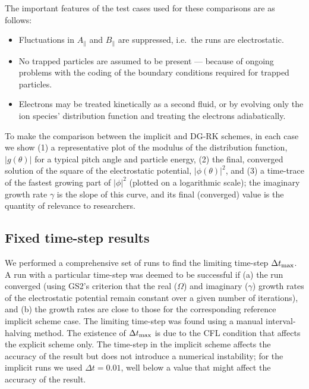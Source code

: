 \documentclass[10pt,a4paper]{article}
\begin{document}
The important features of the test cases used for these comparisons are as
follows:

\begin{itemize}

\item Fluctuations in $A_\parallel$ and $B_\parallel$ are suppressed, i.e.\
  the runs are electrostatic.

\item No trapped particles are assumed to be present --- because of ongoing
  problems with the coding of the boundary conditions required for trapped
  particles.

\item Electrons may be treated kinetically as a second fluid, or by evolving
  only the ion species' distribution function and treating the electrons
  adiabatically.

\end{itemize}

To make the comparison between the implicit and DG-RK schemes, in each case we
show (1) a representative plot of the modulus of the distribution function,
$|g(\theta)|$ for a typical pitch angle and particle energy, (2) the final,
converged solution of the square of the electrostatic potential,
$|\phi(\theta)|^2$, and (3) a time-trace of the fastest growing part of
$|\phi|^2$ (plotted on a logarithmic scale); the imaginary growth rate
$\gamma$ is the slope of this curve, and its final (converged) value is the
quantity of relevance to researchers.

\subsection{Fixed time-step results}

We performed a comprehensive set of runs to find the limiting time-step
$\Delta t_{\mbox{\scriptsize max}}$. A run with a particular time-step was
deemed to be successful if (a) the run converged (using GS2's criterion that
the real ($\Omega$) and imaginary ($\gamma$) growth rates of the electrostatic
potential remain constant over a given number of iterations), and (b) the
growth rates are close to those for the corresponding reference implicit
scheme case. The limiting time-step was found using a manual interval-halving
method. The existence of $\Delta t_{\mbox{\scriptsize max}}$ is due to the CFL
condition that affects the explicit scheme only. The time-step in the implicit
scheme affects the accuracy of the result but does not introduce a numerical
instability; for the implicit runs we used $\Delta t = 0.01$, well below a
value that might affect the accuracy of the result.
\end{document}
